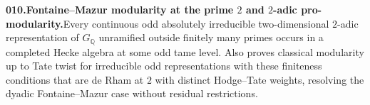 \documentclass[11pt,a4paper]{article}
\begin{document}
  \par \begin{minipage}{\linewidth}
  \fontsize{10.5}{12.6}\selectfont\RaggedRight
  \hypertarget{result 010}{}
  {\bfseries\textcolor{muted}{010.}\enspace Fontaine--Mazur modularity at the prime $2$ and $2$-adic pro-modularity.}\enspace Every continuous odd absolutely irreducible two-dimensional $2$-adic representation of $G_{\mathbb Q}$ unramified outside finitely many primes occurs in a completed Hecke algebra at some odd tame level. Also proves classical modularity up to Tate twist for irreducible odd representations with these finiteness conditions that are de Rham at $2$ with distinct Hodge--Tate weights, resolving the dyadic Fontaine--Mazur case without residual restrictions.\par
  \end{minipage}\par\vspace{5pt}
\end{document}
